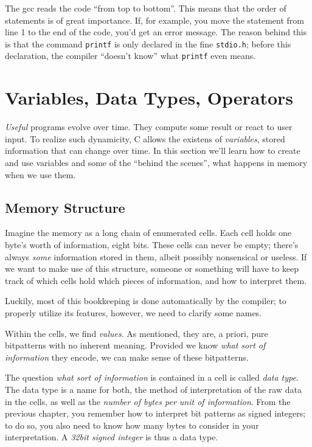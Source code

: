 The gcc reads the code \enquote{from top to bottom}. This means that the order of statements is of great importance. If, for example, you move the  statement from line 1 to the end of the code, you'd get an error message. The reason behind this is that the command \texttt{printf} is only declared in the fine \texttt{stdio.h}; before this declaration, the compiler \enquote{doesn't know} what \texttt{printf} even means.

\section{Variables, Data Types, Operators} \label{sec:expressions}
\emph{Useful} programs evolve over time. They compute some result or react to user input. To realize such dynamicity, C allows the existens of \emph{variables}, \ie stored information that can change over time. In this section we'll learn how to create and use variables and some of the \enquote{behind the scenes}, \ie what happens in memory when we use them.

\subsection{Memory Structure}
Imagine the memory as a long chain of enumerated cells. Each cell holds one byte's worth of information, \ie eight bits. These cells can never be empty; there's always \emph{some} information stored in them, albeit possibly nonsensical or useless. If we want to make use of this structure, someone or something will have to keep track of which cells hold which pieces of information, and how to interpret them.

Luckily, most of this bookkeeping is done automatically by the compiler; to properly utilize its features, however, we need to clarify some names.

Within the cells, we find \emph{values}. As mentioned, they are, a priori, pure bitpatterns with no inherent meaning. Provided we know \emph{what sort of information} they encode, we can make sense of these bitpatterns.

The question \emph{what sort of information} is contained in a cell is called \emph{data type}. The data type is a name for both, the method of interpretation of the raw data in the cells, as well as the \emph{number of bytes per unit of information}. From the previous chapter, you remember how to interpret bit patterns as signed integers; to do so, you also need to know how many bytes to consider in your interpretation. A \emph{32bit signed integer} is thus a data type.

